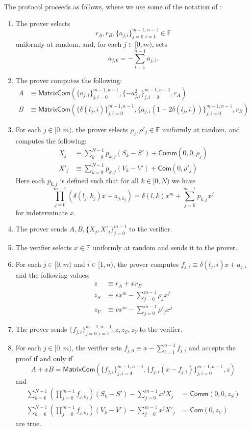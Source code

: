 \documentclass{llncs}
\newcommand{\F}{\mathbb{F}}
\newcommand{\func}[1]{\mathsf{#1}}
\newcommand{\com}{\func{Com}}
\newcommand{\comm}{\func{Comm}}
\begin{document}
The protocol proceeds as follows, where we use some of the notation of \cite{lelantus,triptych}:
\begin{enumerate}
    \item The prover selects $$r_A, r_B, \{a_{j,i}\}_{j=0,i=1}^{m-1,n-1} \in \F$$ uniformly at random, and, for each $j \in [0,m)$, sets $$a_{j,0} = -\sum_{i=1}^{n-1} a_{j,i}.$$
    \item The prover computes the following:
    \begin{align*}
        A &\equiv \func{MatrixCom}\left(\{a_{j,i}\}_{j,i=0}^{m-1,n-1}, \{-a_{j,i}^2\}_{j,i=0}^{m-1,n-1}, r_A\right) \\
        B &\equiv \func{MatrixCom}\left(\{\delta(l_{j},i)\}_{j,i=0}^{m-1,n-1}, \lbrace a_{j,i}(1-2\delta(l_j,i))\rbrace_{j,i=0}^{m-1,n-1}, r_B\right)
    \end{align*}
    \item For each $j \in [0,m)$, the prover selects $\rho_j, \rho'_j \in \F$ uniformly at random, and computes the following:
    \begin{align*}
        X_j &\equiv \sum_{k=0}^{N-1}p_{k,j}(S_k - S') + \comm(0, 0, \rho_j) \\
        X'_j &\equiv \sum_{k=0}^{N-1}p_{k,j}(V_k - V') + \com(0, \rho'_j)
    \end{align*}
    Here each $p_{k,j}$ is defined such that for all $k \in [0,N)$ we have $$\prod_{j=0}^{m-1} \left( \delta(l_j,k_j)x + a_{j,k_j} \right) = \delta(l,k)x^m + \sum_{j=0}^{m-1} p_{k,j}x^j$$ for indeterminate $x$.
    \item The prover sends $A, B, \{X_j, X'_j\}_{j=0}^{m-1}$ to the verifier.
    \item The verifier selects $x \in \F$ uniformly at random and sends it to the prover.
    \item For each $j \in [0,m)$ and $i \in [1,n)$, the prover computes $f_{j,i} \equiv \delta(l_{j},i)x + a_{j,i}$ and the following values:
    \begin{align*}
        z &\equiv r_A + xr_B \\
        z_S &\equiv sx^m -  \sum_{j=0}^{m-1}\rho_j x^j \\
        z_V &\equiv vx^m - \sum_{j=0}^{m-1}\rho'_j x^j
    \end{align*}
    \item The prover sends $\{f_{j,i}\}_{j=0,i=1}^{m-1,n-1}, z, z_S, z_V$ to the verifier.
    \item For each $j \in [0,m)$, the verifier sets $f_{j,0} \equiv x - \sum_{i=1}^{n-1} f_{j,i}$ and accepts the proof if and only if
    $$A + xB = \func{MatrixCom}\left(\lbrace f_{j,i} \rbrace_{j,i=0}^{m-1,n-1}, \lbrace f_{j,i}(x - f_{j,i})\rbrace_{j,i=0}^{m-1,n-1}, z\right)$$
    and
    \begin{align*}
        \sum_{k=0}^{N-1} \left(\prod_{j=0}^{m-1} f_{j,k_j}\right)(S_k - S') - \sum_{j=0}^{m-1} x^j X_j &= \comm(0, 0, z_S) \\
        \sum_{k=0}^{N-1} \left(\prod_{j=0}^{m-1} f_{j,k_j}\right)(V_k - V') - \sum_{j=0}^{m-1} x^j X'_j &= \com(0, z_V)
    \end{align*}
    are true.
\end{enumerate}
\end{document}
